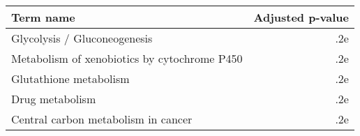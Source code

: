 \begin{tabular}{lr}
\toprule
                                   Term name &  Adjusted p-value \\
\midrule
                Glycolysis / Gluconeogenesis &               .2e \\
Metabolism of xenobiotics by cytochrome P450 &               .2e \\
                      Glutathione metabolism &               .2e \\
                             Drug metabolism &               .2e \\
         Central carbon metabolism in cancer &               .2e \\
\bottomrule
\end{tabular}
